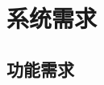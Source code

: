 \documentclass[cs4size,a4paper,nofonts]{ctexart}
\begin{document}




\section{系统需求}

\subsection{功能需求}
\end{document}
